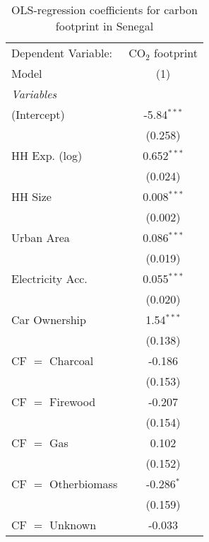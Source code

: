 
\begin{table}[htbp!]
   \centering
   \small
   \begin{adjustbox}{width = 1\textwidth, max height = 0.95\textheight, center}
      \begin{threeparttable}[b]
         \caption{\label{tab:OLS_2_SEN} OLS-regression coefficients for carbon footprint in Senegal}
         \begin{tabular}{lc}
            \tabularnewline \midrule \midrule
            Dependent Variable: & CO$_{2}$ footprint\\  
            Model               & (1)\\  
            \midrule
            \emph{Variables}\\
            (Intercept)         & -5.84$^{***}$\\   
                                & (0.258)\\   
            HH Exp. (log)       & 0.652$^{***}$\\   
                                & (0.024)\\   
            HH Size             & 0.008$^{***}$\\   
                                & (0.002)\\   
            Urban Area          & 0.086$^{***}$\\   
                                & (0.019)\\   
            Electricity Acc.    & 0.055$^{***}$\\   
                                & (0.020)\\   
            Car Ownership       & 1.54$^{***}$\\   
                                & (0.138)\\   
            CF $=$ Charcoal     & -0.186\\   
                                & (0.153)\\   
            CF $=$ Firewood     & -0.207\\   
                                & (0.154)\\   
            CF $=$ Gas          & 0.102\\   
                                & (0.152)\\   
            CF $=$ Otherbiomass & -0.286$^{*}$\\   
                                & (0.159)\\   
            CF $=$ Unknown      & -0.033\\   

\end{tabular}
\end{threeparttable}
\end{adjustbox}
\end{table}
